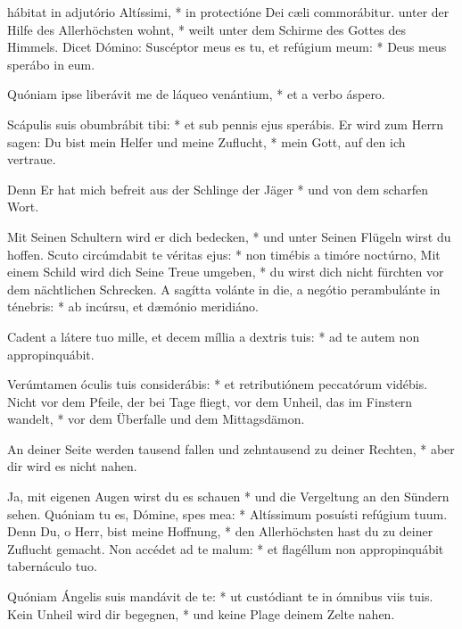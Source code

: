 \documentclass[fontsize=10pt,paper=A5,twoside,BCOR=1mm,DIV=21,headinclude]{scrarticle}
\begin{document}
\vspace{.3em}

\begin{paracol}{2} \pcb
\begin{psalmus}
 hábitat in adjutório Altíssimi, * in protectióne Dei cæli commorábitur.
	\switchcolumn
	 unter der Hilfe des Allerhöchsten wohnt, * weilt unter dem Schirme des Gottes des Himmels.
\switchcolumn*
Dicet Dómino: Suscéptor meus es tu, et refúgium meum: * Deus meus sperábo in eum.

Quóniam ipse liberávit me de láqueo venántium, * et a verbo áspero.

Scápulis suis obumbrábit tibi: * et sub pennis ejus sperábis.
	\switchcolumn
	Er wird zum Herrn sagen: Du bist mein Helfer und meine Zuflucht, * mein Gott, auf den ich vertraue.

	Denn Er hat mich befreit aus der Schlinge der Jäger * und von dem scharfen Wort.
	
	Mit Seinen Schultern wird er dich bedecken, * und unter Seinen Flügeln wirst du hoffen.
\switchcolumn*
Scuto circúmdabit te véritas ejus: * non timébis a timóre noctúrno,
	\switchcolumn
	Mit einem Schild wird dich Seine Treue umgeben, * du wirst dich nicht fürchten vor dem nächtlichen Schrecken.
\switchcolumn*
A sagítta volánte in die, a negótio perambulánte in ténebris: * ab incúrsu, et dæmónio meridiáno.

Cadent a látere tuo mille, et decem míllia a dextris tuis: * ad te autem non appropinquábit.

Verúmtamen óculis tuis considerábis: * et retributiónem peccatórum vidébis.
	\switchcolumn
	Nicht vor dem Pfeile, der bei Tage fliegt, vor dem Unheil, das im Finstern wandelt, * vor dem Überfalle und dem Mittagsdämon.
	
	An deiner Seite werden tausend fallen und zehntausend zu deiner Rechten, * aber dir wird es nicht nahen.
	
	Ja, mit eigenen Augen wirst du es schauen * und die Vergeltung an den Sündern sehen.
\switchcolumn*
Quóniam tu es, Dómine, spes mea: * Altíssimum posuísti refúgium tuum.
	\switchcolumn
	Denn Du, o Herr, bist meine Hoffnung, * den Allerhöchsten hast du zu deiner Zuflucht gemacht.
\switchcolumn*
Non accédet ad te malum: * et flagéllum non appropinquábit tabernáculo tuo.

Quóniam Ángelis suis mandávit de te: * ut custódiant te in ómnibus viis tuis.
	\switchcolumn
	Kein Unheil wird dir begegnen, * und keine Plage deinem Zelte nahen.


\end{psalmus}
\end{paracol}
\end{document}
